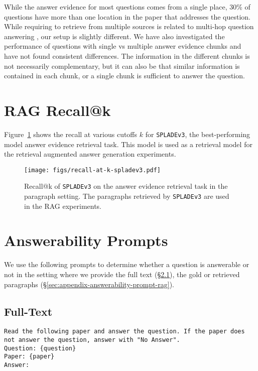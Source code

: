 While the answer evidence for most questions comes from a single place, 30\% of questions have more than one location in the paper that addresses the question. While requiring to retrieve from multiple sources is related to multi-hop question answering \citep{welbl-etal-2018-constructing, yang-etal-2018-hotpotqa}, our setup is slightly different. We have also investigated the performance of questions with single vs multiple answer evidence chunks and have not found consistent differences. The information in the different chunks is not necessarily complementary, but it can also be that similar information is contained in each chunk, or a single chunk is sufficient to answer the question. 

\section{RAG Recall@k}
Figure~\ref{fig:recall-at-k-splade-v3} shows the recall at various cutoffs $k$ for \texttt{SPLADEv3}, the best-performing model answer evidence retrieval task. This model is used as a retrieval model for the retrieval augmented answer generation experiments.
\begin{figure}[!htpb]
    \centering
    \texttt{[image: figs/recall-at-k-spladev3.pdf]}
    \caption{Recall@k of \texttt{SPLADEv3} on the answer evidence retrieval task in the paragraph setting. The paragraphs retrieved by \texttt{SPLADEv3} are used in the RAG experiments.}
    \label{fig:recall-at-k-splade-v3}
\end{figure}


\section{Answerability Prompts}\label{sec:appendix-answerability-prompt}
We use the following prompts to determine whether a question is answerable or not in the setting where we provide the full text (\S\ref{sec:appendix-answerability-prompt-full-text}), the gold or retrieved paragraphs (\S\ref{sec:appendix-answerability-prompt-rag}).
\subsection{Full-Text}\label{sec:appendix-answerability-prompt-full-text}
\texttt{Read the following paper and answer the question. If the paper does not answer the question, answer with "No Answer".\\
Question: \{question\}\\
Paper: \{paper\}\\
Answer:
}
